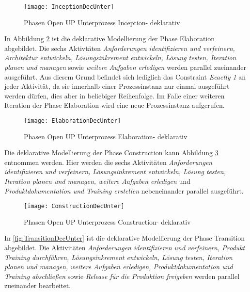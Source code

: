 \begin{figure}[htp]
\begin{center}
  \texttt{[image: InceptionDecUnter]} %
  \caption{Phasen Open UP Unterprozess Inception- deklarativ}
  \label{fig:InceptionDecUnter}
\end{center}
\end{figure}

In Abbildung \ref{fig:ElaborationDecUnter} ist die deklarative Modellierung der Phase Elaboration abgebildet. Die sechs Aktivtäten \textit{Anforderungen identifizieren und verfeinern, Architektur entwickeln, Lösungsinkrement entwickeln, Lösung testen, Iteration planen und managen} sowie \textit{weitere Aufgaben erledigen} werden parallel zueinander ausgeführt. Aus diesem Grund befindet sich lediglich das Constraint \textit{Ecactly 1} an jeder Aktivität, da sie innerhalb einer Prozessinstanz nur einmal ausgeführt werden dürfen, dies aber in beliebiger Reihenfolge. Im Falle einer weiteren Iteration der Phase Elaboration wird eine neue Prozessinstanz aufgerufen. \newline

\begin{figure}[htp]
\begin{center}
  \texttt{[image: ElaborationDecUnter]} %
  \caption{Phasen Open UP Unterprozess Elaboration- deklarativ} 
  \label{fig:ElaborationDecUnter}
\end{center}
\end{figure}

Die deklarative Modellierung der Phase Construction kann Abbildung \ref{fig:ConstructionDecUnter} entnommen werden. Hier werden die sechs Aktivitäten \textit{Anforderungen identifizieren und verfeinern, Lösungsinkrement entwickeln, Lösung testen, Iteration planen und managen, weitere Aufgaben erledigen} und \textit{Produktdokumentation und Training erstellen} nebeneinander parallel ausgeführt.
\begin{figure}[htp]
\begin{center}
  \texttt{[image: ConstructionDecUnter]} %
  \caption{Phasen Open UP Unterprozess Construction- deklarativ}
  \label{fig:ConstructionDecUnter}
\end{center}
\end{figure}

In \ref{fig:TransitionDecUnter} ist die deklarative Modellierung der Phase Transition abgebildet.\newline
Die Aktivitäten \textit{Anforderungen identifizieren und verfeinern, Produkt Training durchführen, Lösungsinkrement entwickeln, Lösung testen, Iteration planen und managen, weitere Aufgaben erledigen, Produktdokumentation und Training abschließen} sowie \textit{Release für die Produktion freigeben} werden parallel zueinander bearbeitet.

